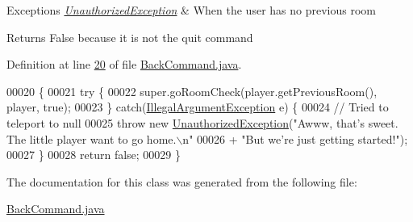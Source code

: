 \begin{DoxyExceptions}{Exceptions}
{\em \hyperlink{classUnauthorizedException}{Unauthorized\-Exception}} & When the user has no previous room \\
\hline
\end{DoxyExceptions}
\begin{DoxyReturn}{Returns}
False because it is not the quit command 
\end{DoxyReturn}


Definition at line \hyperlink{BackCommand_8java_source_l00020}{20} of file \hyperlink{BackCommand_8java_source}{Back\-Command.\-java}.


\begin{DoxyCode}
00020                                                                        \{
00021         \textcolor{keywordflow}{try} \{
00022             super.goRoomCheck(player.getPreviousRoom(), player, \textcolor{keyword}{true});
00023         \} \textcolor{keywordflow}{catch}(\hyperlink{classIllegalArgumentException}{IllegalArgumentException} e)  \{
00024             \textcolor{comment}{// Tried to teleport to null}
00025             \textcolor{keywordflow}{throw} \textcolor{keyword}{new} \hyperlink{classUnauthorizedException}{UnauthorizedException}(\textcolor{stringliteral}{"Awww, that's sweet. The little player
       want to go home.\(\backslash\)n"}
00026                     + \textcolor{stringliteral}{"But we're just getting started!"});
00027         \}
00028         \textcolor{keywordflow}{return} \textcolor{keyword}{false};
00029     \}
\end{DoxyCode}


The documentation for this class was generated from the following file\-:\begin{DoxyCompactItemize}
\item 
\hyperlink{BackCommand_8java}{Back\-Command.\-java}\end{DoxyCompactItemize}
